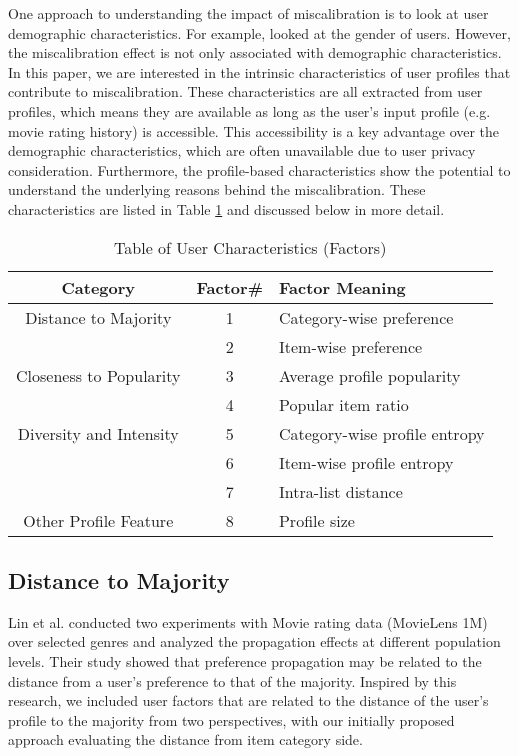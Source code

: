 One approach to understanding the impact of miscalibration is to look at user demographic characteristics. For example, \cite{ekstrand2018exploring} looked at the gender of users. However, the miscalibration effect is not only associated with demographic characteristics. In this paper, we are interested in the intrinsic characteristics of user profiles that contribute to miscalibration. These characteristics are all extracted from user profiles, which means they are available as long as the user's input profile (e.g. movie rating history) is accessible. This accessibility is a key advantage over the demographic characteristics, which are often unavailable due to user privacy consideration. Furthermore, the profile-based characteristics show the potential to understand the underlying reasons behind the miscalibration. These characteristics are listed in Table \ref{tab:factors} and discussed below in more detail.

\begin{table}[!h]
    \centering
    \begin{tabular}{c c l } \hline
    \textbf{Category} &\textbf{Factor\#} &\textbf{Factor Meaning} \\ \hline
    Distance to Majority & 1 & Category-wise preference\\ 
                        & 2 & Item-wise preference\\ \hline
    Closeness to Popularity &  3 & Average profile popularity\\ 
                            & 4 & Popular item ratio \\ \hline
    Diversity and Intensity & 5 & Category-wise profile entropy\\ 
                        & 6 & Item-wise profile entropy \\
                        & 7 & Intra-list distance \\\hline
    Other Profile Feature & 8 & Profile size \\ \hline
          
    \end{tabular}
    \caption{Table of User Characteristics (Factors)}
    \label{tab:factors}
\end{table}


\subsection{Distance to Majority} 

Lin et al. \cite{lin2019crank} conducted two experiments with Movie rating data (MovieLens 1M) over selected genres and analyzed the propagation effects at different population levels. Their study showed that preference propagation may be related to the distance from a user's preference to that of the majority. Inspired by this research, we included user factors that are related to the distance of the user's profile to the majority from two perspectives, with our initially proposed approach evaluating the distance from item category side.
 
